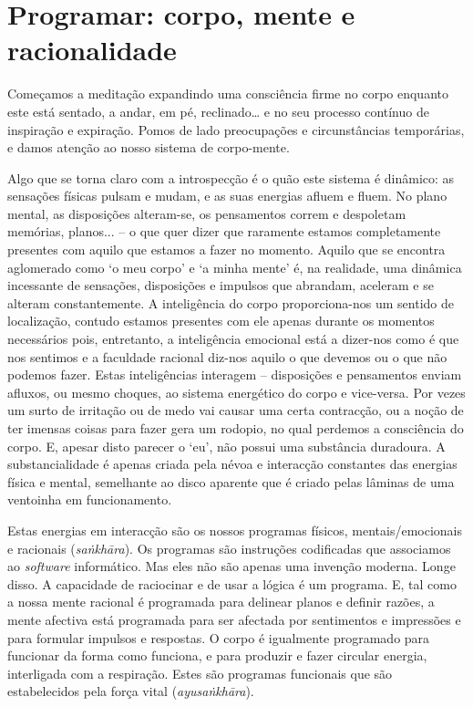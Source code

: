 \section{Programar: corpo, mente e racionalidade}

Começamos a meditação expandindo uma consciência firme no corpo enquanto este está sentado, a andar, em pé, reclinado\ldots{} e no seu processo contínuo de inspiração e expiração. Pomos de lado preocupações e circunstâncias temporárias, e damos atenção ao nosso sistema de corpo-mente.

Algo que se torna claro com a introspecção é o quão este sistema é dinâmico: as sensações físicas pulsam e mudam, e as suas energias afluem e fluem. No plano mental, as disposições alteram-se, os pensamentos correm e despoletam memórias, planos... -- o que quer dizer que raramente estamos completamente presentes com aquilo que estamos a fazer no momento. Aquilo que se encontra aglomerado como `o meu corpo' e `a minha mente' é, na realidade, uma dinâmica incessante de sensações, disposições e impulsos que abrandam, aceleram e se alteram constantemente. A inteligência do corpo proporciona-nos um sentido de localização, contudo estamos presentes com ele apenas durante os momentos necessários pois, entretanto, a inteligência emocional está a dizer-nos como é que nos sentimos e a faculdade racional diz-nos aquilo o que devemos ou o que não podemos fazer. Estas inteligências interagem -- disposições e pensamentos enviam afluxos, ou mesmo choques, ao sistema energético do corpo e vice-versa. Por vezes um surto de irritação ou de medo vai causar uma certa contracção, ou a noção de ter imensas coisas para fazer gera um rodopio, no qual perdemos a consciência do corpo. E, apesar disto parecer o `eu', não possui uma substância duradoura. A substancialidade é apenas criada pela névoa e interacção constantes das energias física e mental, semelhante ao disco aparente que é criado pelas lâminas de uma ventoinha em funcionamento.

Estas energias em interacção são os nossos programas físicos, mentais/emocionais e racionais (\emph{saṅkhāra}). Os programas são instruções codificadas que associamos ao \emph{software} informático. Mas eles não são apenas uma invenção moderna. Longe disso. A capacidade de raciocinar e de usar a lógica é um programa. E, tal como a nossa mente racional é programada para delinear planos e definir razões, a mente afectiva está programada para ser afectada por sentimentos e impressões e para formular impulsos e respostas. O corpo é igualmente programado para funcionar da forma como funciona, e para produzir e fazer circular energia, interligada com a respiração. Estes são programas funcionais que são estabelecidos pela força vital (\emph{ayusaṅkhāra}).

